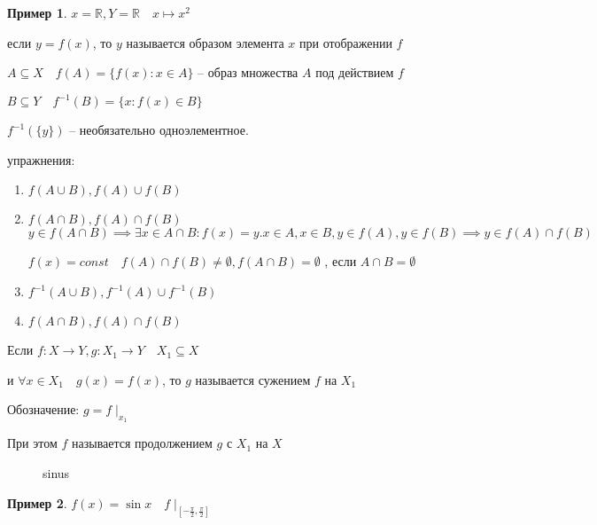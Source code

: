 \documentclass{book}
\newcommand\R{\ensuremath{\mathbb{R}}}
\renewcommand\O{\ensuremath{\emptyset}}
\theoremstyle{definition}
\newtheorem*{example}{Пример}
\begin{document}
    \begin{example}
        $x = \R, Y = \R \quad x\mapsto x^2$

        если $y=f(x)$, то $y$ называется образом элемента $x$ при отображении $f$
    \end{example}

    $A\subseteq X\quad f(A) = \{f(x): x\in A\}$ -- образ множества $A$ под действием $f$

    $B\subseteq Y\quad f^{-1}(B) = \{x:f(x)\in B\}$

    $f^{-1}(\{y\})$ -- необязательно одноэлементное.


упражнения:
\begin{enumerate}
    \item $f(A\cup B), f(A)\cup f(B) $
    \item $f(A\cap B), f(A) \cap f(B)
$
        $y\in f(A\cap B) \implies  \exists x\in A\cap B:f(x) = y. x\in A, x\in B, y\in f(A), y\in f(B) \implies  y\in f(A)\cap f(B)$

        $f(x) = const\quad f(A)\cap f(B)\neq \O , f(A\cap B) = \O$ , если $A\cap B = \O $
    \item $f^{-1}(A\cup B), f^{-1}(A)\cup f^{-1}(B)$
    \item $f(A\cap B), f(A) \cap f(B)$
\end{enumerate}

\begin{definition}
    Если $f:X\to Y, g:X_1\to Y\quad X_1\subseteq X $

    и $\forall x\in X_1 \quad g(x) = f(x)$, то $g$ называется сужением $f$ на $X_1$

    Обозначение: $g = f\mid_{x_1}$

    При этом $f$ называется продолжением $g$ с $X_1$ на $X$
\end{definition}

\begin{figure}[h]
    \centering
    \caption{sinus}
    \label{sinus}
\end{figure}

\begin{example}
    $f(x) = \sin x\quad f\mid_{[-\frac{\pi}{2}, \frac{\pi}{2}]}$
    
\end{example}
   
\end{document}
